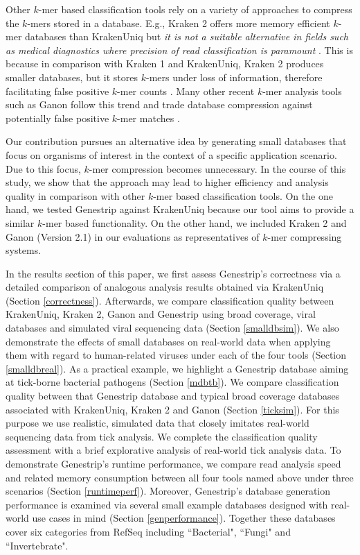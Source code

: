 \documentclass[pdflatex,sn-vancouver-num]{sn-jnl}
\begin{document}
Other $k$-mer based classification tools rely on a variety of approaches to compress the $k$-mers stored in a database. 
    E.g., Kraken 2 offers more memory efficient $k$-mer databases than KrakenUniq but \emph{it is not a suitable alternative in fields such as medical diagnostics where precision of read classification is paramount} \citep{lowmemkraken}. This is because in comparison with Kraken 1 and KrakenUniq, Kraken 2 produces smaller databases, but it stores $k$-mers under loss of information, therefore facilitating false positive $k$-mer counts \citep{kraken2, lowmemkraken}. Many other recent $k$-mer analysis tools such as Ganon follow this trend and trade database compression against potentially false positive $k$-mer matches \citep{10.1093/nargab/lqaf094, Piro:2020aa}.

 Our contribution pursues an alternative idea by generating small databases that focus on organisms of interest in the context of a specific application scenario. Due to this focus, $k$-mer compression becomes unnecessary. In the course of this study, we show that the approach may lead to higher efficiency and analysis quality in comparison with other $k$-mer based classification tools.
On the one hand, we tested Genestrip against KrakenUniq because our tool aims to provide a similar $k$-mer based functionality.
On the other hand, we included Kraken 2 and Ganon (Version 2.1) in our evaluations as representatives of $k$-mer compressing systems.

    In the results section of this paper, we first assess Genestrip's correctness via a detailed comparison of analogous analysis results obtained via KrakenUniq (Section \ref{correctness}). Afterwards, we compare classification quality between KrakenUniq, Kraken 2, Ganon and Genestrip using broad coverage, viral databases and simulated viral sequencing data (Section \ref{smalldbsim}). We also demonstrate the effects of small databases on real-world data when applying them with regard to human-related viruses under each of the four tools (Section \ref{smalldbreal}). As a practical example, we highlight a Genestrip database aiming at tick-borne bacterial pathogens (Section \ref{mdbtb}). We compare classification quality between that Genestrip database and typical broad coverage databases associated with KrakenUniq, Kraken 2 and Ganon (Section \ref{ticksim}). For this purpose we use realistic, simulated data that closely imitates real-world sequencing data from tick analysis. We complete the classification quality assessment with a brief explorative analysis of real-world tick analysis data. To demonstrate Genestrip's runtime performance, we compare read analysis speed and related memory consumption between all four tools named above under three scenarios (Section \ref{runtimeperf}). Moreover, Genestrip's database generation performance is examined via several small example databases designed with real-world use cases in mind (Section \ref{genperformance}). Together these databases cover six categories from RefSeq including ``Bacterial", ``Fungi" and ``Invertebrate". 
    
\end{document}
